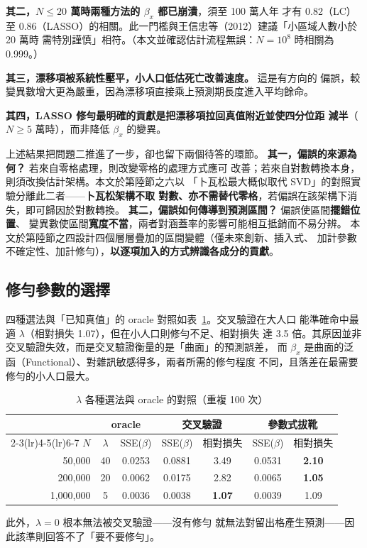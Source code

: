 \documentclass[UTF8, fontset=macnew, a4paper, 12pt]{ctexart}
\begin{document}
\textbf{其二，$N\le20$ 萬時兩種方法的 $\beta_x$ 都已崩潰}，須至 100 萬人年
才有 0.82（LC）至 0.86（LASSO）的相關。此一門檻與王信忠等（2012）建議「小區域人數小於 20 萬時
需特別謹慎」相符。（本文並確認估計流程無誤：$N=10^8$ 時相關為 0.999。）

\textbf{其三，漂移項被系統性壓平，小人口低估死亡改善速度。} 這是有方向的
偏誤，較變異數增大更為嚴重，因為漂移項直接乘上預測期長度進入平均餘命。

\textbf{其四，LASSO 修勻最明確的貢獻是把漂移項拉回真值附近並使四分位距
減半}（$N\ge5$ 萬時），而非降低 $\beta_x$ 的變異。

\vspace{4pt}
上述結果把問題二推進了一步，卻也留下兩個待答的環節。
\textbf{其一，偏誤的來源為何？} 若來自零格處理，則改變零格的處理方式應可
改善；若來自對數轉換本身，則須改換估計架構。本文於第陸節之六以
「卜瓦松最大概似取代 SVD」的對照實驗分離此二者——\textbf{卜瓦松架構不取
對數、亦不需替代零格}，若偏誤在該架構下消失，即可歸因於對數轉換。
\textbf{其二，偏誤如何傳導到預測區間？} 偏誤使區間\textbf{擺錯位置}、
變異數使區間\textbf{寬度不當}，兩者對涵蓋率的影響可能相互抵銷而不易分辨。
本文於第陸節之四設計四個層層疊加的區間變體（僅未來創新、插入式、
加計參數不確定性、加計修勻），\textbf{以逐項加入的方式辨識各成分的貢獻}。

\subsection{修勻參數的選擇}

四種選法與「已知真值」的 oracle 對照如表~\ref{tab:lamsel}。交叉驗證在大人口
能準確命中最適 $\lambda$（相對損失 1.07），但在小人口則修勻不足、相對損失
達 3.5 倍。其原因並非交叉驗證失效，而是交叉驗證衡量的是「曲面」的預測誤差，
而 $\beta_x$ 是曲面的泛函（Functional）、對雜訊敏感得多，兩者所需的修勻程度
不同，且落差在最需要修勻的小人口最大。

\begin{table}[H]
\centering
\caption{$\lambda$ 各種選法與 oracle 的對照（重複 100 次）}
\small
\begin{tabular}{rcccccc}
\toprule
& \multicolumn{2}{c}{oracle} & \multicolumn{2}{c}{交叉驗證}
& \multicolumn{2}{c}{參數式拔靴}\\
\cmidrule(lr){2-3}\cmidrule(lr){4-5}\cmidrule(lr){6-7}
$N$ & $\lambda$ & SSE($\beta$) & SSE($\beta$) & 相對損失
    & SSE($\beta$) & 相對損失\\
\midrule
50,000    & 40 & 0.0253 & 0.0881 & 3.49 & 0.0531 & \textbf{2.10}\\
200,000   & 20 & 0.0062 & 0.0175 & 2.82 & 0.0065 & \textbf{1.05}\\
1,000,000 & \phantom{0}5 & 0.0036 & 0.0038 & \textbf{1.07} & 0.0039 & 1.09\\
\bottomrule
\end{tabular}
\label{tab:lamsel}
\end{table}
此外，$\lambda=0$ 根本無法被交叉驗證——沒有修勻
就無法對留出格產生預測——因此該準則回答不了「要不要修勻」。
\end{document}
